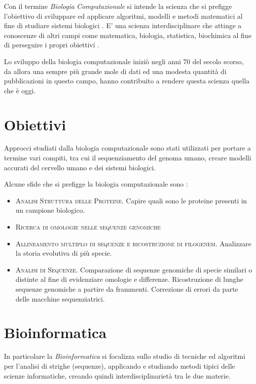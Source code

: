 Con il termine \textit{Biologia Computazionale} si intende la scienza che si prefigge l'obiettivo di sviluppare ed applicare algoritmi, modelli e metodi matematici al fine di studiare sistemi biologici \cite{Searls19983}. E' una scienza interdisciplinare che attinge a conoscenze di altri campi come matematica, biologia, statistica, biochimica al fine di perseguire i propri obiettivi \cite{AbouttheCCMB}.

Lo sviluppo della biologia computazionale iniziò negli anni 70 del secolo scorso, da allora una sempre più grande mole di dati ed una modesta quantità di pubblicazioni in questo campo, hanno contribuito a rendere questa scienza quella che è oggi.

\section{Obiettivi}
Approcci studiati dalla biologia computazionale sono stati utilizzati per portare a termine vari compiti, tra cui il sequenziamento del genoma umano, creare modelli accurati del cervello umano e dei sistemi biologici.

Alcune sfide che si prefigge la biologia computazionale sono \cite{Searls19983}: 

\begin{itemize}
    \item \textsc{Analisi Struttura delle Proteine.} Capire quali sono le proteine presenti in un campione biologico.
    \item \textsc{Ricerca di omologie nelle sequenze genomiche}
    \item \textsc{Allineamento multiplo di sequenze e ricostruzione di filogenesi.} Analizzare la storia evolutiva di più specie.
    \item \textsc{Analisi di Sequenze.} Comparazione di sequenze genomiche di specie similari o distinte al fine di evidenziare omologie e differenze. Ricostruzione di lunghe sequenze genomiche a partire da frammenti. Correzione di errori da parte delle macchine sequenziatrici. 
\end{itemize}

\section{Bioinformatica}
In particolare la \textit{Bioinformatica} si focalizza sullo studio di tecniche ed algoritmi per l'analisi di strighe (sequenze), applicando e studiando metodi tipici delle scienze informatiche, creando quindi interdisciplinarietà tra le due materie.


